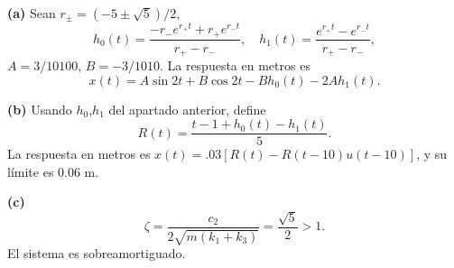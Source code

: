 \noindent\textbf{(a)} Sean \(r_\pm=(-5\pm\sqrt5)/2\),
\[h_0(t)=\frac{-r_-e^{r_+t}+r_+e^{r_-t}}{r_+-r_-},\quad h_1(t)=\frac{e^{r_+t}-e^{r_-t}}{r_+-r_-},\]
\(A=3/10100\), \(B=-3/1010\). La respuesta en metros es
\[x(t)=A\sin2t+B\cos2t-Bh_0(t)-2Ah_1(t).\]

\noindent\textbf{(b)} Usando \(h_0\),\(h_1\) del apartado anterior, define
\[R(t)=\frac{t-1+h_0(t)-h_1(t)}5.\]
La respuesta en metros es \(x(t)=.03[R(t)-R(t-10)u(t-10)]\), y su límite es 0.06 m.

\noindent\textbf{(c)} \[\zeta=\frac{c_2}{2\sqrt{m(k_1+k_3)}}=\frac{\sqrt5}{2}>1.\]
El sistema es sobreamortiguado.
